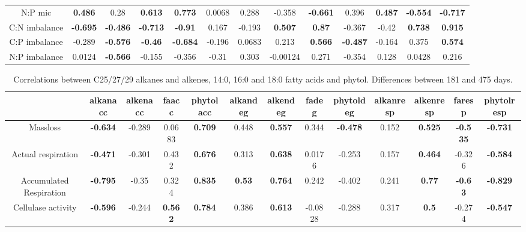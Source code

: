 \documentclass[10pt]{article}
\begin{document}
\begin{landscape}
\begin{table}[h!]
\begin{center}
{\begin{tabular}{ccccccccccccc}
  N:P mic & \textbf{ 0.486 } & 0.28 & \textbf{ 0.613 } & \textbf{ 0.773 } & 0.0068 & 0.288 & -0.358 & \textbf{ -0.661 } & 0.396 & \textbf{ 0.487 } & \textbf{ -0.554 } & \textbf{ -0.717 } \\ 
  C:N imbalance & \textbf{ -0.695 } & \textbf{ -0.486 } & \textbf{ -0.713 } & \textbf{ -0.91 } & 0.167 & -0.193 & \textbf{ 0.507 } & \textbf{ 0.87 } & -0.367 & -0.42 & \textbf{ 0.738 } & \textbf{ 0.915 } \\ 
  C:P imbalance & -0.289 & \textbf{ -0.576 } & \textbf{ -0.46 } & \textbf{ -0.684 } & -0.196 & 0.0683 & 0.213 & \textbf{ 0.566 } & \textbf{ -0.487 } & -0.164 & 0.375 & \textbf{ 0.574 } \\ 
  N:P imbalance & 0.0124 & \textbf{ -0.566 } & -0.155 & -0.356 & -0.31 & 0.303 & -0.00124 & 0.271 & -0.354 & 0.128 & 0.0428 & 0.216 \\ 
   \hline
\end{tabular}
}
\end{center}
\end{table}
\newpage
\begin{table}[h!]
\begin{center}
\caption{Correlations between C25/27/29 alkanes and alkenes, 14:0, 16:0 and 18:0 fatty acids and phytol. Differences between 181 and 475 days.}
\label{corrtable2_notlig}
{\tiny
\begin{tabular}{ccccccccccccc}
  \hline
 & alkanacc & alkenacc & faacc & phytolacc & alkandeg & alkendeg & fadeg & phytoldeg & alkanresp & alkenresp & faresp & phytolresp \\ 
  \hline
Massloss & \textbf{ -0.634 } & -0.289 & 0.0683 & \textbf{ 0.709 } & 0.448 & \textbf{ 0.557 } & 0.344 & \textbf{ -0.478 } & 0.152 & \textbf{ 0.525 } & \textbf{ -0.535 } & \textbf{ -0.731 } \\ 
  Actual respiration & \textbf{ -0.471 } & -0.301 & 0.432 & \textbf{ 0.676 } & 0.313 & \textbf{ 0.638 } & 0.0176 & -0.253 & 0.157 & \textbf{ 0.464 } & -0.326 & \textbf{ -0.584 } \\ 
  Accumulated Respiration & \textbf{ -0.795 } & -0.35 & 0.324 & \textbf{ 0.835 } & \textbf{ 0.53 } & \textbf{ 0.764 } & 0.242 & -0.402 & 0.241 & \textbf{ 0.77 } & \textbf{ -0.63 } & \textbf{ -0.829 } \\ 
  Cellulase activity & \textbf{ -0.596 } & -0.244 & \textbf{ 0.562 } & \textbf{ 0.784 } & 0.386 & \textbf{ 0.613 } & -0.0828 & -0.288 & 0.317 & \textbf{  0.5 } & -0.274 & \textbf{ -0.547 } \\ 

\end{tabular}}
\end{center}
\end{table}
\end{landscape}
\end{document}
